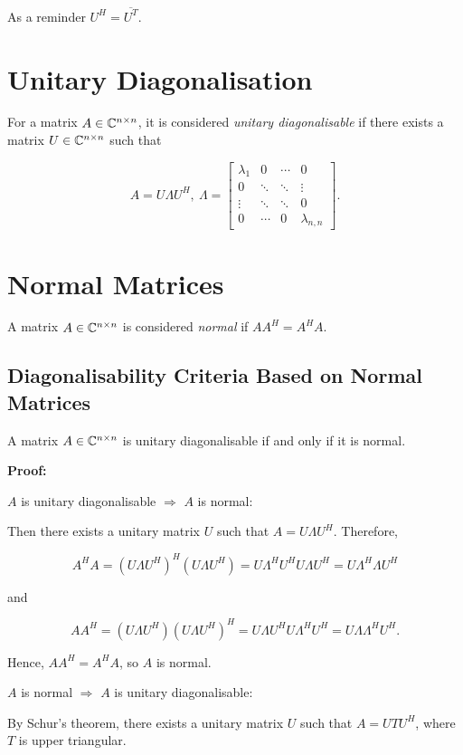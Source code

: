 As a reminder \(U^H = \overline{U^T}\).

\section{Unitary Diagonalisation}

For a matrix \(A \in \mathbb{C}^{n \times n}\), it is considered \emph{unitary diagonalisable} if there exists a matrix 
\(U \in \mathbb{C}^{n \times n}\) such that

\[
    A = U \Lambda U^H, \
    \Lambda = 
    \begin{bmatrix}
        \lambda_1 & 0 & \cdots & 0 \\ 
        0 & \ddots & \ddots &  \vdots \\ 
        \vdots & \ddots & \ddots &  0 \\ 
        0 & \cdots & 0 & \lambda_{n,n}
    \end{bmatrix}.
\]

\section{Normal Matrices}

A matrix \(A \in \mathbb{C}^{n \times n}\) is considered \emph{normal} if \(AA^H = A^H A\).

\subsection{Diagonalisability Criteria Based on Normal Matrices}

A matrix \(A \in \mathbb{C}^{n \times n}\) is unitary diagonalisable if and only if it is normal.

\textbf{Proof:}

\(A\) is unitary diagonalisable \(\Rightarrow\) \(A\) is normal:

Then there exists a unitary matrix \(U\) such that \(A = U \Lambda U^H\). Therefore, 

\[
    A^H A = (U \Lambda U^H)^H (U \Lambda U^H) = U \Lambda^H U^H U \Lambda U^H = U \Lambda^H \Lambda U^H
\]

and 

\[
    A A^H = (U \Lambda U^H)(U \Lambda U^H)^H = U \Lambda U^H U \Lambda^H U^H = U \Lambda \Lambda^H U^H.
\]

Hence, \(A A^H = A^H A\), so \(A\) is normal.

\(A\) is normal \(\Rightarrow\) \(A\) is unitary diagonalisable:

By Schur's theorem, there exists a unitary matrix \(U\) such that \(A = U T U^H\), where \(T\) is upper triangular.

